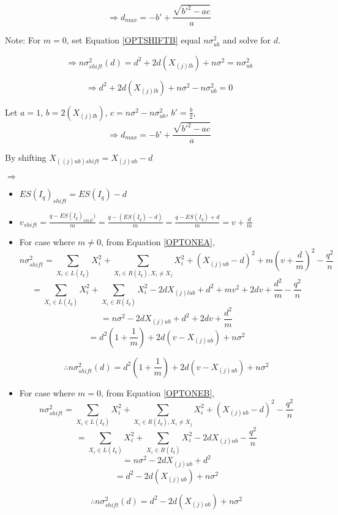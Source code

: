 \documentclass[a4paper,12pt]{article}
\begin{document}
$$ \Rightarrow d_{max}= -b' + \frac{\sqrt{b'^2-ac}}{a}$$

Note: For $m = 0$, set Equation \ref{OPTSHIFTB} equal $n \sigma_{ub}^2$ and solve for $d$. 

$$
\Rightarrow n\sigma^2_{shift}(d)= d^2 + 2d(X_{(j)lb}) + n\sigma^2 = n \sigma_{ub}^2
$$

$$
\Rightarrow d^2 + 2d(X_{(j)lb}) + n\sigma^2 - n \sigma_{ub}^2 = 0
$$

Let $a = 1$, $b=2(X_{(j)lb})$, $c=n\sigma^2 - n \sigma_{ub}^2$, $b'=\frac{b}{2}$, 
\begin{equation}
\label{DMAXA} \Rightarrow d_{max}= -b' + \frac{\sqrt{b'^2-ac}}{a}
\end{equation}

By shifting $X_{((j)ub)shift}=X_{(j)ub} - d$


$\Rightarrow$
\begin{itemize}

\item $ES(I_{q})_{shift} = ES(I_{q}) - d$

\item $v_{shift} = \frac{q-ES(I_{q})_{shift})}{m} = \frac{q-(ES(I_{q}) - d)}{m} = \frac{q - ES(I_{q}) + d}{m} = v + \frac{d}{m}$

\item For case where $m \neq 0$, from Equation \ref{OPTONEA},
$$
n\sigma^2_{shift}  = \sum_{X_{i} \in L(I_{q})}X_{i}^2 + \sum_{X_{i} \in R(I_{q}), X_{i}\neq X_{j}}X_{i}^2 + (X_{(j)ub} - d)^2 + m(v + \frac{d}{m})^2 - \frac{q^2}{n}
$$ 
$$
= \sum_{X_{i} \in L(I_{q})}X_{i}^2 + \sum_{X_{i} \in R(I_{q})}X_{i}^2 - 2dX_{(j)lub} + d^2 + mv^2 + 2dv + \frac{d^2}{m} - \frac{q^2}{n}
$$
$$
= n\sigma^2 - 2dX_{(j)ub} + d^2 +2dv + \frac{d^2}{m}
$$
$$
= d^2(1+\frac{1}{m}) + 2d(v-X_{(j)ub}) + n\sigma^2
$$

\begin{equation}
\label{OPTSHIFTC}
\therefore n\sigma^2_{shift}(d)= d^2(1+\frac{1}{m}) + 2d(v-X_{(j)ub}) + n\sigma^2
\end{equation}

\item For case where $m = 0$, from Equation \ref{OPTONEB},
$$
n\sigma^2_{shift}  = \sum_{X_{i} \in L(I_{q})}X_{i}^2 + \sum_{X_{i} \in R(I_{q}), X_{i}\neq X_{j}}X_{i}^2 + (X_{(j)ub} - d)^2 - \frac{q^2}{n}
$$ 
$$
= \sum_{X_{i} \in L(I_{q})}X_{i}^2 + \sum_{X_{i} \in R(I_{q})}X_{i}^2 - 2dX_{(j)ub} - \frac{q^2}{n}
$$
$$
= n\sigma^2 - 2dX_{(j)ub} + d^2 
$$
$$
= d^2 - 2d(X_{(j)ub}) + n\sigma^2
$$

\begin{equation}
\label{OPTSHIFTD}
\therefore n\sigma^2_{shift}(d) = d^2 - 2d(X_{(j)ub}) + n\sigma^2
\end{equation}

\end{itemize}
\end{document}

